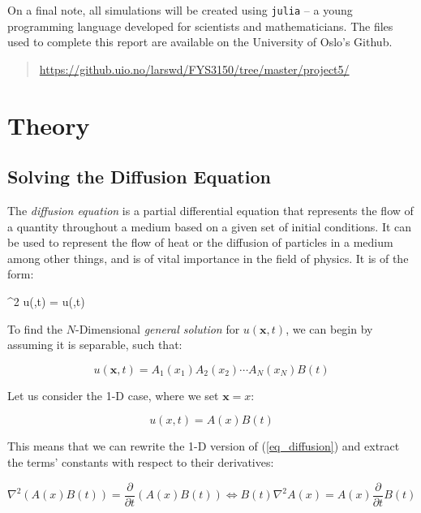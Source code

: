 \documentclass[a4paper,10pt,english]{article}
\newenvironment{boxequation}{
\begin{tcolorbox}[ams equation, enhanced, colback=black!50!green!10!white, colframe=black, fuzzy shadow={0mm}{-4pt}{-0.5pt}{0.4mm}{black!60!white}]}
{\end{tcolorbox}}
\renewcommand{\vec}[1]{\mathbf{#1}}
\begin{document}
On a final note, all simulations will be created using \texttt{julia} – a young programming language developed for scientists and mathematicians.  The files used to complete this report are available on the University of Oslo's Github.

\begin{quote}
\url{https://github.uio.no/larswd/FYS3150/tree/master/project5/}
\end{quote}

\section*{Theory}

\subsection*{Solving the Diffusion Equation}

The \textit{diffusion equation} is a partial differential equation that represents the flow of a quantity throughout a medium based on a given set of initial conditions.  It can be used to represent the flow of heat or the diffusion of particles in a medium among other things, and is of vital importance in the field of physics.  It is of the form:

\begin{boxequation}
\label{eq_diffusion}
\nabla^2 u(\vec{x},t) =  u(\vec{x},t)
\end{boxequation}

To find the $N$-Dimensional \textit{general solution} for $u(\vec{x},t)$, we can begin by assuming it is separable, such that:

\begin{equation*}
u(\vec{x},t) = A_1(x_1) A_2(x_2) \cdots A_N (x_N) B(t)
\end{equation*}

Let us consider the 1-D case, where we set $\vec{x} = x$:

\begin{equation*}
u(x,t) = A(x) B(t)
\end{equation*}

This means that we can rewrite the 1-D version of (\ref{eq_diffusion}) and extract the terms' constants with respect to their derivatives:

\begin{equation*}
\nabla^2 \left( A(x) B(t) \right) = \frac{\partial}{\partial t} \left( A(x) B(t) \right) \iff B(t) \nabla^2 A(x) = A(x) \frac{\partial}{\partial t} B(t)
\end{equation*}
\end{document}
